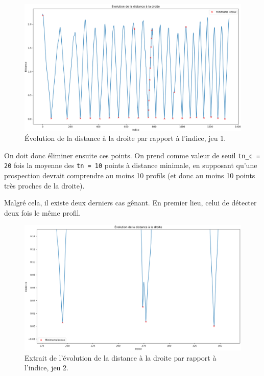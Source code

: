 \documentclass[12pt]{article}
\begin{document}
    \begin{figure}[ht!]
        \centering
        \includegraphics[width=\textwidth]{Images/PseudoProf_dist_1.png}  
        \caption{Évolution de la distance à la droite par rapport à l'indice, jeu 1.}
    \end{figure}

    On doit donc éliminer ensuite ces points. On prend comme valeur de seuil \texttt{tn\_c = 20} fois la moyenne des \texttt{tn = 10} points à distance minimale, en supposant qu'une prospection devrait comprendre au moins 10 profils (et donc au moins 10 points très proches de la droite).

    Malgré cela, il existe deux derniers cas gênant. En premier lieu, celui de détecter deux fois le même profil.
    
    \begin{figure}[ht!]
        \centering
        \includegraphics[width=\textwidth]{Images/PseudoProf_dist_2.png}  
        \caption{Extrait de l'évolution de la distance à la droite par rapport à l'indice, jeu 2.}
    \end{figure}
\end{document}
